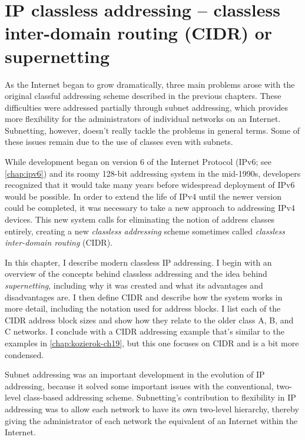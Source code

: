 \chapter[IP classless addressing -- CIDR or supernetting]{IP classless addressing -- classless inter-domain routing (CIDR) or supernetting}
\label{chap:kozierok-ch20}

As the Internet began to grow dramatically, three main problems arose
with the original classful addressing scheme described in the previous
chapters. These difficulties were addressed partially through subnet
addressing, which provides more flexibility for the administrators of
individual networks on an Internet. Subnetting, however, doesn't really
tackle the problems in general terms. Some of these issues remain due to
the use of classes even with subnets.

While development began on version 6 of the Internet Protocol
(IPv6; see \vref{chap:ipv6}) and its roomy 128-bit
addressing system in the mid-1990s, developers recognized that it would take many years before widespread deployment of IPv6 would be possible.
In order to extend the life of IPv4 until the newer version could be completed, it was necessary to take a new approach to addressing IPv4 devices.
This new system calls for eliminating the notion of address classes entirely, creating a new {\emph{classless addressing}} scheme sometimes called \emph{classless inter-domain routing} (CIDR).

In this chapter, I describe modern classless IP addressing. I begin with
an overview of the concepts behind classless addressing and the idea
behind {\emph{supernetting}}, including why it was created and what its
advantages and disadvantages are. I then define
CIDR and
describe how the system works in more detail, including the notation
used for address blocks. I list each of the CIDR address block sizes and
show how they relate to the older class A, B, and C networks. I conclude
with a CIDR addressing example that's similar to the examples in
\cref{chap:kozierok-ch19}, but this one focuses on CIDR
and is a bit more condensed.

Subnet addressing was an important development in the evolution of IP
addressing, because it solved some important issues with the
conventional, two-level class-based addressing scheme. Subnetting's
contribution to flexibility in IP addressing was to allow each network
to have its own two-level hierarchy, thereby giving the administrator of
each network the equivalent of an Internet within the Internet.

